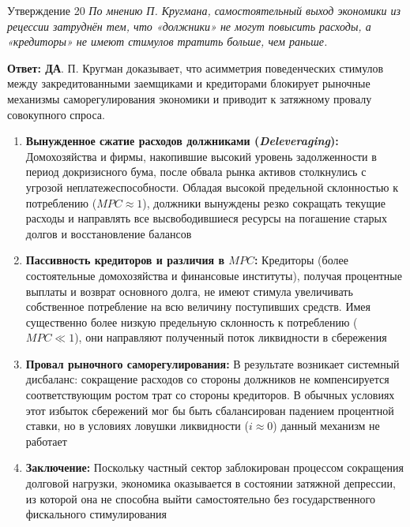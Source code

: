 \documentclass[10pt,a4paper]{article}
\newcommand{\qda}{\textbf{\color{yesgreen}Ответ: ДА}}
\newenvironment{answer}[2]{%
  \begin{qbox}{Утверждение #1}
  \textit{#2}\par\smallskip
}{%
  \end{qbox}\vspace{2pt}
}
\begin{document}
\begin{answer}{20}{По мнению П. Кругмана, самостоятельный выход экономики из рецессии затруднён тем, что «должники» не могут повысить расходы, а «кредиторы» не имеют стимулов тратить больше, чем раньше.}
\qda. П. Кругман доказывает, что асимметрия поведенческих стимулов между закредитованными заемщиками и кредиторами блокирует рыночные механизмы саморегулирования экономики и приводит к затяжному провалу совокупного спроса.

\begin{enumerate}
    \item \textbf{Вынужденное сжатие расходов должниками (\textit{Deleveraging}):}
    Домохозяйства и фирмы, накопившие высокий уровень задолженности в период докризисного бума, после обвала рынка активов столкнулись с угрозой неплатежеспособности. Обладая высокой предельной склонностью к потреблению ($MPC \approx 1$), должники вынуждены резко сокращать текущие расходы и направлять все высвободившиеся ресурсы на погашение старых долгов и восстановление балансов

    \item \textbf{Пассивность кредиторов и различия в $MPC$:}
    Кредиторы (более состоятельные домохозяйства и финансовые институты), получая процентные выплаты и возврат основного долга, не имеют стимула увеличивать собственное потребление на всю величину поступивших средств. Имея существенно более низкую предельную склонность к потреблению ($MPC \ll 1$), они направляют полученный поток ликвидности в сбережения

    \item \textbf{Провал рыночного саморегулирования:}
    В результате возникает системный дисбаланс: сокращение расходов со стороны должников не компенсируется соответствующим ростом трат со стороны кредиторов. В обычных условиях этот избыток сбережений мог бы быть сбалансирован падением процентной ставки, но в условиях ловушки ликвидности ($i \approx 0$) данный механизм не работает

    \item \textbf{Заключение:}
    Поскольку частный сектор заблокирован процессом сокращения долговой нагрузки, экономика оказывается в состоянии затяжной депрессии, из которой она не способна выйти самостоятельно без государственного фискального стимулирования
\end{enumerate}
\end{answer}
\end{document}
